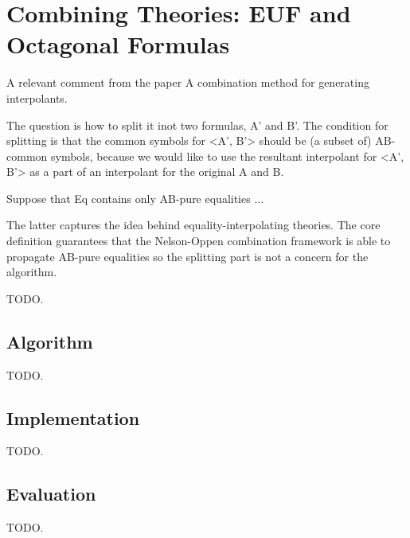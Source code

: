 \chapter{Combining Theories: EUF and Octagonal Formulas}

A relevant comment from the paper A combination method for generating interpolants.

The question is how to split it inot two formulas, A' and B'. The condition for splitting is that
the common symbols for <A', B'> should be (a subset of) AB-common symbols, because we would like
to use the resultant interpolant for <A', B'> as a part of an interpolant
for the original A and B.

  Suppose that Eq contains only AB-pure equalities ...

  The latter captures the idea behind equality-interpolating theories. The core definition guarantees 
  that the Nelson-Oppen combination framework is able to propagate  
  AB-pure equalities so the splitting part is not a concern for the algorithm.

TODO.

\section{Algorithm}
 
TODO.

\section{Implementation}

TODO.

\section{Evaluation}
TODO.

